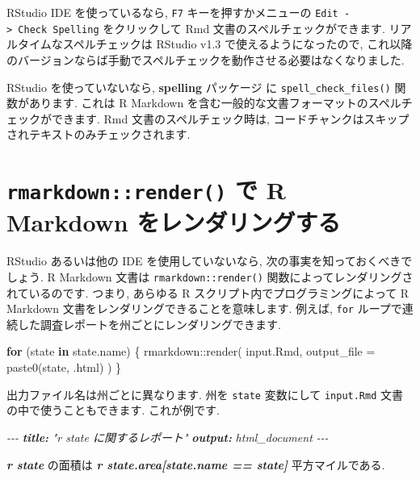 \documentclass[
  11pt,
  lualatex,
  ja=standard]{bxjsreport}
\newenvironment{Shaded}{\begin{snugshade}}{\end{snugshade}}
\newcommand{\AnnotationTok}[1]{\textcolor[rgb]{0.56,0.35,0.01}{\textbf{\textit{#1}}}}
\newcommand{\AttributeTok}[1]{\textcolor[rgb]{0.77,0.63,0.00}{#1}}
\newcommand{\CommentTok}[1]{\textcolor[rgb]{0.56,0.35,0.01}{\textit{#1}}}
\newcommand{\ControlFlowTok}[1]{\textcolor[rgb]{0.13,0.29,0.53}{\textbf{#1}}}
\newcommand{\FunctionTok}[1]{\textcolor[rgb]{0.00,0.00,0.00}{#1}}
\newcommand{\InformationTok}[1]{\textcolor[rgb]{0.56,0.35,0.01}{\textbf{\textit{#1}}}}
\newcommand{\NormalTok}[1]{#1}
\newcommand{\SpecialCharTok}[1]{\textcolor[rgb]{0.00,0.00,0.00}{#1}}
\newcommand{\StringTok}[1]{\textcolor[rgb]{0.31,0.60,0.02}{#1}}
\begin{document}
RStudio IDE を使っているなら, \texttt{F7} キーを押すかメニューの \texttt{Edit -\textgreater{}\ Check\ Spelling} をクリックして Rmd 文書のスペルチェックができます. リアルタイムなスペルチェックは RStudio v1.3 で使えるようになったので, これ以降のバージョンならば手動でスペルチェックを動作させる必要はなくなりました.

RStudio を使っていないなら, \textbf{spelling} パッケージ \autocite{R-spelling} に \texttt{spell\_check\_files()} 関数があります. これは R Markdown を含む一般的な文書フォーマットのスペルチェックができます. Rmd 文書のスペルチェック時は, コードチャンクはスキップされテキストのみチェックされます.

\hypertarget{rmarkdown-render}{%
\section{\texorpdfstring{\texttt{rmarkdown::render()} で R Markdown をレンダリングする}{rmarkdown::render() で R Markdown をレンダリングする}}\label{rmarkdown-render}}

RStudio あるいは他の IDE を使用していないなら, 次の事実を知っておくべきでしょう. R Markdown 文書は \texttt{rmarkdown::render()} 関数によってレンダリングされているのです. つまり, あらゆる R スクリプト内でプログラミングによって R Markdown 文書をレンダリングできることを意味します. 例えば, \texttt{for} ループで連続した調査レポートを州ごとにレンダリングできます.

\begin{Shaded}
\begin{Highlighting}[numbers=left,,]
\ControlFlowTok{for}\NormalTok{ (state }\ControlFlowTok{in}\NormalTok{ state.name) \{}
\NormalTok{  rmarkdown}\SpecialCharTok{::}\FunctionTok{render}\NormalTok{(}
    \StringTok{\textquotesingle{}input.Rmd\textquotesingle{}}\NormalTok{, }\AttributeTok{output\_file =} \FunctionTok{paste0}\NormalTok{(state, }\StringTok{\textquotesingle{}.html\textquotesingle{}}\NormalTok{)}
\NormalTok{  )}
\NormalTok{\}}
\end{Highlighting}
\end{Shaded}

出力ファイル名は州ごとに異なります. 州を \texttt{state} 変数にして \texttt{input.Rmd} 文書の中で使うこともできます. これが例です.

\begin{Shaded}
\begin{Highlighting}[]
\CommentTok{{-}{-}{-}}
\AnnotationTok{title:}\CommentTok{ "\textasciigrave{}r state\textasciigrave{} に関するレポート"}
\AnnotationTok{output:}\CommentTok{ html\_document}
\CommentTok{{-}{-}{-}}

\InformationTok{\textasciigrave{}r state\textasciigrave{}}\NormalTok{ の面積は }\InformationTok{\textasciigrave{}r state.area[state.name == state]\textasciigrave{}}\NormalTok{ 平方マイルである.}
\end{Highlighting}
\end{Shaded}
\end{document}
